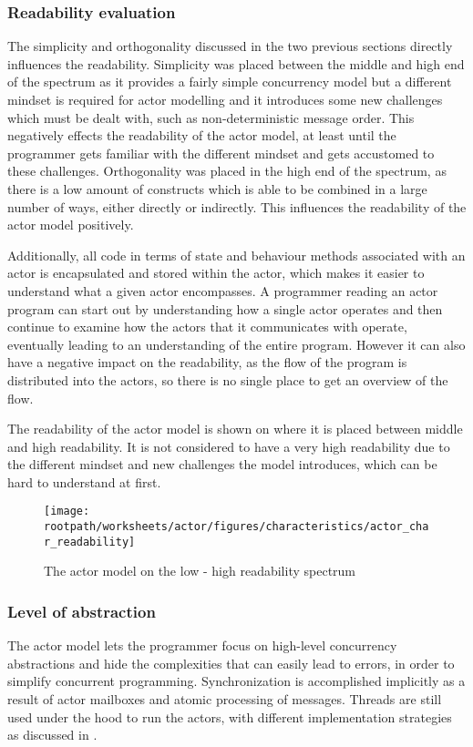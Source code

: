 \subsubsection{Readability evaluation}
The simplicity and orthogonality discussed in the two previous sections directly influences the readability. Simplicity was placed between the middle and high end of the spectrum as it provides a fairly simple concurrency model but a different mindset is required for actor modelling and it introduces some new challenges which must be dealt with, such as non-deterministic message order. This negatively effects the readability of the actor model, at least until the programmer gets familiar with the different mindset and gets accustomed to these challenges. Orthogonality was placed in the high end of the spectrum, as there is a low amount of constructs which is able to be combined in a large number of ways, either directly or indirectly. This influences the readability of the actor model positively.

Additionally, all code in terms of state and behaviour methods associated with an actor is encapsulated and stored within the actor, which makes it easier to understand what a given actor encompasses. A programmer reading an actor program can start out by understanding how a single actor operates and then continue to examine how the actors that it communicates with operate, eventually leading to an understanding of the entire program. However it can also have a negative impact on the readability, as the flow of the program is distributed into the actors, so there is no single place to get an overview of the flow.

The readability of the actor model is shown on  where it is placed between middle and high readability. It is not considered to have a very high readability due to the different mindset and new challenges the model introduces, which can be hard to understand at first.

\begin{figure}[htbp]
\centering
 \texttt{[image: \\rootpath/worksheets/actor/figures/characteristics/actor\_char\_readability]} 
 \caption{The actor model on the low - high readability spectrum}
\label{fig:actor_readability}
\end{figure}

\subsubsection{Level of abstraction}\label{sec:actor_level_of_abstraction}
The actor model lets the programmer focus on high-level concurrency abstractions and hide the complexities that can easily lead to errors, in order to simplify concurrent programming. Synchronization is accomplished implicitly as a result of actor mailboxes and atomic processing of messages. Threads are still used under the hood to run the actors, with different implementation strategies as discussed in .

